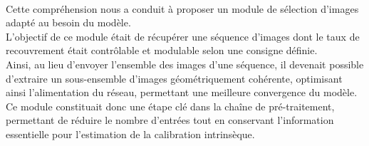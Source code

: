 \documentclass[12pt,a4paper,oneside]{report}
\begin{document}
\paragraph{} Cette compréhension nous a conduit à proposer un module de sélection d'images adapté au besoin du modèle.\\
 L'objectif de ce module était de récupérer une séquence d'images dont le taux de recouvrement était contrôlable et modulable selon une consigne définie. \\
\hspace*{.3cm} Ainsi, au lieu d'envoyer l'ensemble des images d'une séquence, il devenait possible d'extraire un sous-ensemble d'images géométriquement cohérente, optimisant ainsi l'alimentation du réseau, permettant une meilleure convergence du modèle.\\
 Ce module constituait donc une étape clé dans la chaîne de pré-traitement, permettant de réduire le nombre d'entrées tout en conservant l'information essentielle pour l'estimation de la calibration intrinsèque.

\bigskip
\bigskip
\bigskip
\end{document}
